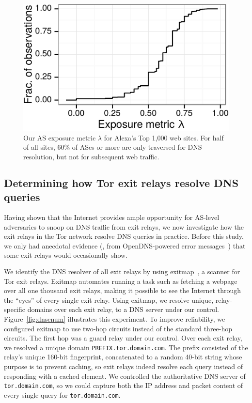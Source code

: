 
\begin{figure}[t]
	\centering
	\includegraphics[width=0.75\linewidth]{figures/dns-exposure.pdf}
	\caption{Our AS exposure metric $\lambda$ for Alexa's Top 1,000 web sites.
	For half of all sites, 60\% of ASes or more are only traversed for DNS
	resolution, but not for subsequent web traffic.}
	\label{fig:exposure}
\end{figure}

\subsection{Determining how Tor exit relays resolve DNS queries}
\label{sec:mapping-resolvers}

Having shown that the Internet provides ample opportunity for
AS-level adversaries to snoop on DNS traffic from exit relays, we
now investigate how the exit relays in the Tor network resolve DNS
queries in practice. Before this study,
we only had anecdotal evidence (\eg, from OpenDNS-powered error
messages~\cite[\S~4.1]{Winter2014b}) that some exit relays would occasionally
show.

We identify the DNS resolver of all exit relays by using
exitmap~\cite{exitmap}, a scanner for Tor exit relays.  Exitmap automates
running a task such as fetching a webpage over all one thousand exit relays,
making it possible to see the Internet through the ``eyes'' of every single
exit relay.  Using exitmap, we resolve unique, relay-specific domains over
each exit relay, to a DNS server under our control.
Figure~\ref{fig:dnsenum} illustrates this experiment.  To improve reliability, we configured
exitmap to use two-hop circuits instead of the standard three-hop circuits.
The first hop was a guard relay under our control.  Over each exit relay, we
resolved a unique domain {\tt PREFIX.tor.domain.com}.  The prefix consisted of the
relay's unique 160-bit fingerprint, concatenated to a random 40-bit string
whose purpose is to prevent caching, so exit relays indeed resolve each query
instead of responding with a cached element.  We controlled the authoritative
DNS server of {\tt tor.domain.com}, so we could capture both the IP address and packet
content of every single query for {\tt tor.domain.com}.

